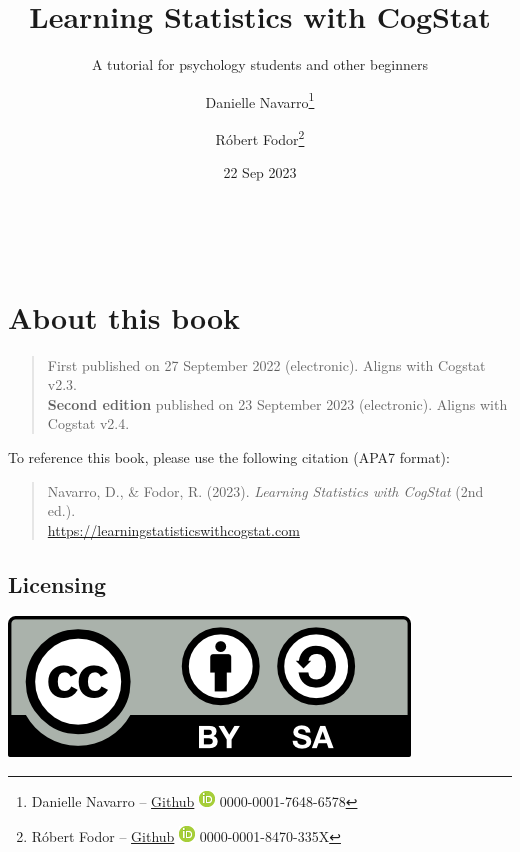 \documentclass[
  11pt,
  a4paper,
  twoside,symmetric,openright]{book}
\title{Learning Statistics with CogStat}
\subtitle{A tutorial for psychology students and other beginners}
\author{Danielle Navarro\footnote{Danielle Navarro -- \href{https://github.com/djnavarro/}{Github} \textbar{} \href{https://orcid.org/0000-0001-7648-6578}{\includegraphics{resources/image/orcid_16x16.png}} 0000-0001-7648-6578} \and Róbert Fodor\footnote{Róbert Fodor -- \href{https://github.com/robertfodor/}{Github} \textbar{} \href{https://orcid.org/0000-0001-8470-335X}{\includegraphics{resources/image/orcid_16x16.png}} 0000-0001-8470-335X}}
\date{22 Sep 2023}
\theoremstyle{break}
\theoremstyle{break}
\let\oldmaketitle\maketitle
\begin{document}
\maketitle

\frontmatter
{} %

\let\maketitle\oldmaketitle
\maketitle
\
\newpage

\mainmatter
{}

{
\hypersetup{linkcolor=black}
\setcounter{tocdepth}{1}
\tableofcontents
}
\chapter*{About this book}\label{about-this-book}

\begin{quote}
First published on 27 September 2022 (electronic). Aligns with Cogstat v2.3.\\
\textbf{Second edition} published on 23 September 2023 (electronic). Aligns with Cogstat v2.4.
\end{quote}

To reference this book, please use the following citation (APA7 format):

\begin{quote}
Navarro, D., \& Fodor, R. (2023). \emph{Learning Statistics with CogStat} (2nd ed.).\\
\url{https://learningstatisticswithcogstat.com}
\end{quote}

\section*{Licensing}\label{licensing}

\includegraphics[width=0.15\linewidth]{resources/image/by-sa}
\end{document}
